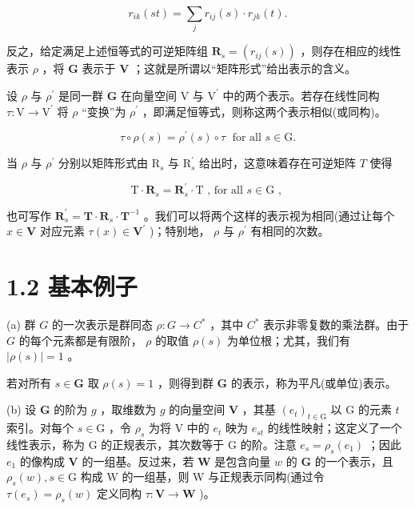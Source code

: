 \documentclass[10pt]{article}
\begin{document}
\[
{r}_{ik}\left( {st}\right)  = \mathop{\sum }\limits_{j}{r}_{ij}\left( s\right)  \cdot  {r}_{jk}\left( t\right) .
\]

反之，给定满足上述恒等式的可逆矩阵组 \({\mathbf{R}}_{s} = \left( {{r}_{ij}\left( s\right) }\right)\) ，则存在相应的线性表示 \(\rho\) ，将 \(\mathbf{G}\) 表示于 \(\mathbf{V}\) ；这就是所谓以“矩阵形式”给出表示的含义。

设 \(\rho\) 与 \({\rho }^{\prime }\) 是同一群 \(\mathbf{G}\) 在向量空间 \(\mathrm{V}\) 与 \({\mathrm{V}}^{\prime }\) 中的两个表示。若存在线性同构 \(\tau  : \mathrm{V} \rightarrow  {\mathrm{V}}^{\prime }\) 将 \(\rho\) “变换”为 \({\rho }^{\prime }\) ，即满足恒等式，则称这两个表示相似(或同构)。

\[
\tau  \circ  \rho \left( s\right)  = {\rho }^{\prime }\left( s\right)  \circ  \tau \;\text{ for all }s \in  \mathrm{G}.
\]

当 \(\rho\) 与 \({\rho }^{\prime }\) 分别以矩阵形式由 \({\mathrm{R}}_{s}\) 与 \({\mathrm{R}}_{s}^{\prime }\) 给出时，这意味着存在可逆矩阵 \(T\) 使得

\[
\mathrm{T} \cdot  {\mathbf{R}}_{s} = {\mathbf{R}}_{s}^{\prime } \cdot  \mathrm{T}\text{ , for all }s \in  \mathrm{G}\text{ , }
\]

也可写作 \({\mathbf{R}}_{s}^{\prime } = \mathbf{T} \cdot  {\mathbf{R}}_{s} \cdot  {\mathbf{T}}^{-1}\) 。我们可以将两个这样的表示视为相同(通过让每个 \(x \in  \mathbf{V}\) 对应元素 \(\tau \left( x\right)  \in  {\mathbf{V}}^{\prime }\) )；特别地， \(\rho\) 与 \({\rho }^{\prime }\) 有相同的次数。

\section*{1.2 基本例子}

(a) 群 \(G\) 的一次表示是群同态 \(\rho  : G \rightarrow  {C}^{ * }\) ，其中 \({C}^{ * }\) 表示非零复数的乘法群。由于 \(G\) 的每个元素都是有限阶， \(\rho\) 的取值 \(\rho \left( s\right)\) 为单位根；尤其，我们有 \(\left| {\rho \left( s\right) }\right|  = 1\) 。

若对所有 \(s \in  \mathbf{G}\) 取 \(\rho \left( s\right)  = 1\) ，则得到群 \(\mathbf{G}\) 的表示，称为平凡(或单位)表示。

(b) 设 \(\mathbf{G}\) 的阶为 \(g\) ，取维数为 \(g\) 的向量空间 \(\mathbf{V}\) ，其基 \({\left( {e}_{t}\right) }_{t \in  \mathrm{G}}\) 以 \(\mathrm{G}\) 的元素 \(t\) 索引。对每个 \(s \in  \mathrm{G}\) ，令 \({\rho }_{s}\) 为将 \(\mathrm{V}\) 中的 \({e}_{t}\) 映为 \({e}_{st}\) 的线性映射；这定义了一个线性表示，称为 G 的正规表示，其次数等于 G 的阶。注意 \({e}_{s} = {\rho }_{s}\left( {e}_{1}\right)\) ；因此 \({e}_{1}\) 的像构成 \(\mathbf{V}\) 的一组基。反过来，若 \(\mathbf{W}\) 是包含向量 \(w\) 的 \(\mathbf{G}\) 的一个表示，且 \({\rho }_{s}\left( w\right) ,s \in  \mathrm{G}\) 构成 \(\mathrm{W}\) 的一组基，则 W 与正规表示同构(通过令 \(\tau \left( {e}_{s}\right)  = {\rho }_{s}\left( w\right)\) 定义同构 \(\tau  : \mathbf{V} \rightarrow  \mathbf{W}\) )。
\end{document}
